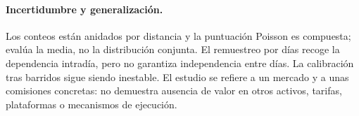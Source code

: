 \paragraph{Incertidumbre y generalización.}
Los conteos están anidados por distancia y la puntuación Poisson es compuesta; evalúa la media, no la distribución conjunta. El remuestreo por días recoge la dependencia intradía, pero no garantiza independencia entre días. La calibración tras barridos sigue siendo inestable. El estudio se refiere a un mercado y a unas comisiones concretas: no demuestra ausencia de valor en otros activos, tarifas, plataformas o mecanismos de ejecución.

